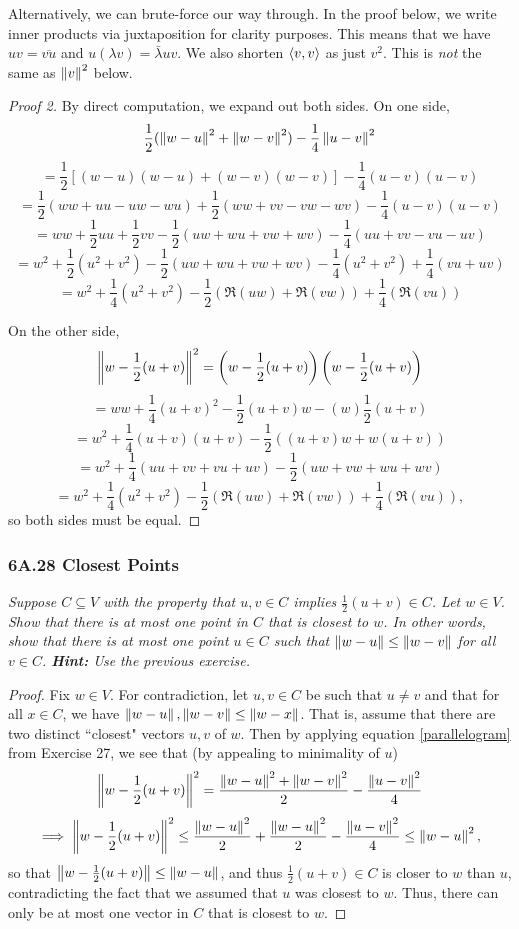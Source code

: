 \documentclass{article}
\begin{document}
Alternatively, we can brute-force our way through. In the proof below, we write inner products via juxtaposition for clarity purposes. This means that we have $uv = \overline{vu}$ and $u(\lambda v)  =\bar\lambda uv$. We also shorten $\left\langle v,v\right\rangle$ as just $v^2$. This is \textit{not} the same as $\left\Vert v\right\Vert^2$ below.
\begin{proof}[Proof 2]
By direct computation, we expand out both sides. On one side,
$$\frac 12(\left\Vert w-u\right\Vert^2+\left\Vert w-v\right\Vert^2) - \frac 14\left\Vert u-v\right\Vert^2$$
$$=\frac 12[(w-u)(w-u) + (w-v)(w-v)] - \frac 14(u-v)(u-v)$$
$$=\frac 12(ww + uu - uw - wu) + \frac 12(ww + vv - vw - wv) - \frac 14(u-v)(u-v)$$
$$=ww + \frac 12uu + \frac 12vv - \frac 12(uw + wu + vw + wv) - \frac 14(uu+vv-vu-uv)$$
$$=w^2 + \frac 12({u^2+v^2}) - \frac 12(uw + wu + vw + wv) - \frac 14(u^2+v^2) + \frac 14(vu + uv)$$
$$=w^2 + \frac 14(u^2+v^2) - \frac 12(\Re(uw) + \Re(vw)) + \frac 14(\Re(vu))$$

On the other side,
$$\left\Vert w - \frac 12(u+v)\right\Vert^2 = \left(w - \frac 12(u+v) \right)\left(w - \frac 12(u+v) \right)$$
$$=ww + \frac 14(u+v)^2 - \frac 12(u+v)w - (w)\frac 12(u+v)$$
$$=w^2 + \frac 14(u+v)(u+v) - \frac 12((u+v)w + w(u+v))$$
$$=w^2 + \frac 14(uu+vv+vu+uv) - \frac 12(uw + vw + wu + wv)$$
$$=w^2 + \frac 14(u^2 + v^2) -\frac 12(\Re(uw) + \Re(vw)) + \frac 14(\Re(vu)),$$
so both sides must be equal.
\end{proof}
\subsubsection*{6A.28 Closest Points}
\textit{Suppose $C\subseteq V$ with the property that $u,v\in C$ implies $\frac 12(u+v)\in C$. Let $w\in V$. Show that there is at most one point in $C$ that is closest to $w$. In other words, show that there is at most one point $u\in C$ such that $\left\Vert w-u\right\Vert \leq \left\Vert w-v\right\Vert$ for all $v\in C$. \textbf{Hint:} Use the previous exercise.}
\begin{proof}
Fix $w\in V$. For contradiction, let $u,v\in C$ be such that $u\neq v$ and that for all $x\in C$, we have $\left\Vert w-u\right\Vert, \left\Vert w-v\right\Vert \leq \left\Vert w-x\right\Vert$. That is, assume that there are two distinct ``closest" vectors $u, v$ of $w$. Then by applying equation \eqref{parallelogram} from Exercise 27, we see that (by appealing to minimality of $u$)
$$\left\Vert w-\frac 12(u+v)\right\Vert^2 = \frac{\left\Vert w-u\right\Vert^2 + \left\Vert w-v\right\Vert^2}{2} - \frac{\left\Vert u-v\right\Vert^2}4$$
$$\implies \left\Vert w-\frac 12(u+v)\right\Vert^2\leq \frac{\left\Vert w-u\right\Vert^2}{2} + \frac{\left\Vert w-u\right\Vert^2}2- \frac{\left\Vert u-v\right\Vert^2}4 \leq \left\Vert w-u\right\Vert^2,$$
so that $\left\Vert w-\frac 12(u+v)\right\Vert \leq \left\Vert w-u\right\Vert$, and thus $\frac 12(u+v)\in C$ is closer to $w$ than $u$, contradicting the fact that we assumed that $u$ was closest to $w$. Thus, there can only be at most one vector in $C$ that is closest to $w$.
\end{proof}
\end{document}

